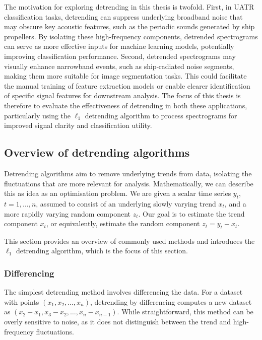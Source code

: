 The motivation for exploring detrending in this thesis is twofold. First, in UATR classification tasks, detrending can suppress underlying broadband noise that may obscure key acoustic features, such as the periodic sounds generated by ship propellers. By isolating these high-frequency components, detrended spectrograms can serve as more effective inputs for machine learning models, potentially improving classification performance. Second, detrended spectrograms may visually enhance narrowband events, such as ship-radiated noise segments, making them more suitable for image segmentation tasks. This could facilitate the manual training of feature extraction models or enable clearer identification of specific signal features for downstream analysis. The focus of this thesis is therefore to evaluate the effectiveness of detrending in both these applications, particularly using the $\ell_1$ detrending algorithm to process spectrograms for improved signal clarity and classification utility.

\subsection{Overview of detrending algorithms}

Detrending algorithms aim to remove underlying trends from data, isolating the fluctuations that are more relevant for analysis. Mathematically, we can describe this as idea as an optimisation problem. We are given a scalar time series $y_t$, $t = 1, \ldots, n$, assumed to consist of an underlying slowly varying trend $x_t$, and a more rapidly varying random component $z_t$. Our goal is to estimate the trend component $x_t$, or equivalently, estimate the random component $z_t = y_t - x_t$. 

This section provides an overview of commonly used methods and introduces the $\ell_1$ detrending algorithm, which is the focus of this section.

\subsubsection{Differencing}
The simplest detrending method involves differencing the data. For a dataset with points $(x_1, x_2, \ldots, x_n)$, detrending by differencing computes a new dataset as $(x_2 - x_1, x_3 - x_2, \ldots, x_n - x_{n-1})$. While straightforward, this method can be overly sensitive to noise, as it does not distinguish between the trend and high-frequency fluctuations.


